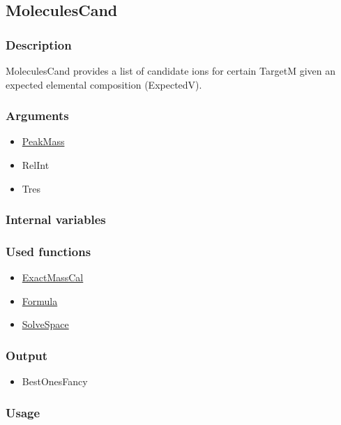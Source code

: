 \subsection{MoleculesCand}
\subsubsection{Description}
MoleculesCand provides a list of candidate ions for certain TargetM given an expected elemental composition (ExpectedV).
\subsubsection{Arguments}
\begin{itemize}
\item \hyperref[PeakMass]{PeakMass}
\item RelInt
\item Tres
\end{itemize}
\subsubsection{Internal variables}
\subsubsection{Used functions}
\begin{itemize}
\item \hyperref[ExactMassCal]{ExactMassCal}
\item \hyperref[Formula]{Formula}
\item \hyperref[SolveSpace]{SolveSpace}
\end{itemize}
\subsubsection{Output}
\begin{itemize}
\item BestOnesFancy %
\end{itemize}
\subsubsection{Usage}

